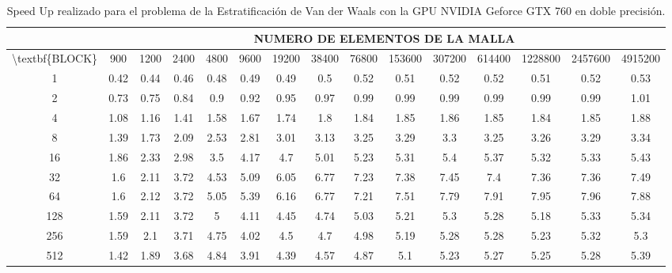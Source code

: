 \begin{table}[]
    \begin{tabular}{|c|c|c|c|c|c|c|c|c|c|c|c|c|c|c|}
    \hline
                                    & \multicolumn{14}{c|}{NUMERO DE ELEMENTOS DE LA MALLA}                                                             \\ \hline
    \textbackslash{}textbf\{BLOCK\} & 900  & 1200 & 2400 & 4800 & 9600 & 19200 & 38400 & 76800 & 153600 & 307200 & 614400 & 1228800 & 2457600 & 4915200 \\ \hline
    1                               & 0.42 & 0.44 & 0.46 & 0.48 & 0.49 & 0.49  & 0.5   & 0.52  & 0.51   & 0.52   & 0.52   & 0.51    & 0.52    & 0.53    \\ \hline
    2                               & 0.73 & 0.75 & 0.84 & 0.9  & 0.92 & 0.95  & 0.97  & 0.99  & 0.99   & 0.99   & 0.99   & 0.99    & 0.99    & 1.01    \\ \hline
    4                               & 1.08 & 1.16 & 1.41 & 1.58 & 1.67 & 1.74  & 1.8   & 1.84  & 1.85   & 1.86   & 1.85   & 1.84    & 1.85    & 1.88    \\ \hline
    8                               & 1.39 & 1.73 & 2.09 & 2.53 & 2.81 & 3.01  & 3.13  & 3.25  & 3.29   & 3.3    & 3.25   & 3.26    & 3.29    & 3.34    \\ \hline
    16                              & 1.86 & 2.33 & 2.98 & 3.5  & 4.17 & 4.7   & 5.01  & 5.23  & 5.31   & 5.4    & 5.37   & 5.32    & 5.33    & 5.43    \\ \hline
    32                              & 1.6  & 2.11 & 3.72 & 4.53 & 5.09 & 6.05  & 6.77  & 7.23  & 7.38   & 7.45   & 7.4    & 7.36    & 7.36    & 7.49    \\ \hline
    64                              & 1.6  & 2.12 & 3.72 & 5.05 & 5.39 & 6.16  & 6.77  & 7.21  & 7.51   & 7.79   & 7.91   & 7.95    & 7.96    & 7.88    \\ \hline
    128                             & 1.59 & 2.11 & 3.72 & 5    & 4.11 & 4.45  & 4.74  & 5.03  & 5.21   & 5.3    & 5.28   & 5.18    & 5.33    & 5.34    \\ \hline
    256                             & 1.59 & 2.1  & 3.71 & 4.75 & 4.02 & 4.5   & 4.7   & 4.98  & 5.19   & 5.28   & 5.28   & 5.23    & 5.32    & 5.3     \\ \hline
    512                             & 1.42 & 1.89 & 3.68 & 4.84 & 3.91 & 4.39  & 4.57  & 4.87  & 5.1    & 5.23   & 5.27   & 5.25    & 5.28    & 5.39    \\ \hline
    \end{tabular}
    \caption{Speed Up realizado para el problema de la Estratificación de Van der Waals con la GPU NVIDIA Geforce GTX 760 en doble precisión.}
    \label{tab:s_760_VdW_double_10}
    \end{table}